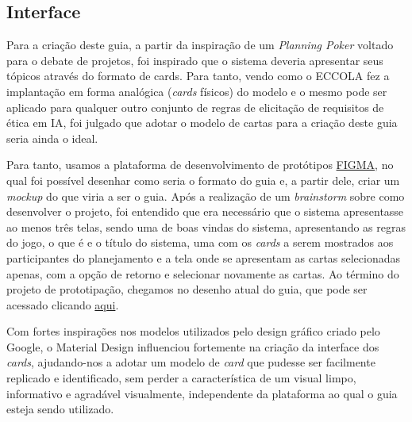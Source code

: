 \subsection{Interface}

Para a criação deste guia, a partir da inspiração de um \textit{Planning Poker} voltado para o debate de projetos, foi inspirado que o sistema deveria apresentar seus tópicos através do formato de cards. Para tanto, vendo como o ECCOLA \cite{ECCOLA} fez a implantação em forma analógica (\textit{cards} físicos) do modelo e o mesmo pode ser aplicado para qualquer outro conjunto de regras de elicitação de requisitos de ética em \acrshort{IA}, foi julgado que adotar o modelo de cartas para a criação deste guia seria ainda o ideal.

Para tanto, usamos a plataforma de desenvolvimento de protótipos \href{https://www.figma.com/}{FIGMA}, no qual foi possível desenhar como seria o formato do guia e, a partir dele, criar um \textit{mockup} do que viria a ser o guia. Após a realização de um \textit{brainstorm} sobre como desenvolver o projeto, foi entendido que era necessário que o sistema apresentasse ao menos três telas, sendo uma de boas vindas do sistema, apresentando as regras do jogo, o que é e o título do sistema, uma com os \textit{cards} a serem mostrados aos participantes do planejamento e a tela onde se apresentam as cartas selecionadas apenas, com a opção de retorno e selecionar novamente as cartas. Ao término do projeto de prototipação, chegamos no desenho atual do guia, que pode ser acessado clicando \href{https://www.figma.com/file/zW8ISzBYMcIZFk6BoXZD4n/Eccola}{aqui}.

Com fortes inspirações nos modelos utilizados pelo design gráfico criado pelo Google, o Material Design influenciou fortemente na criação da interface dos \textit{cards}, ajudando-nos a adotar um modelo de \textit{card} que pudesse ser facilmente replicado e identificado, sem perder a característica de um visual limpo, informativo e agradável visualmente, independente da plataforma ao qual o guia esteja sendo utilizado. 

